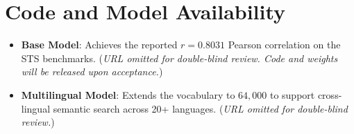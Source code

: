 \documentclass[11pt, conference, compsoc, twoside]{IEEEtran}
\begin{document}
\appendix
\section{Code and Model Availability}
\begin{itemize}
    \item \textbf{Base Model}: Achieves the reported $r = 0.8031$ Pearson correlation on the STS benchmarks. (\textit{URL omitted for double-blind review. Code and weights will be released upon acceptance.})
    \item \textbf{Multilingual Model}: Extends the vocabulary to $64{,}000$ to support cross-lingual semantic search across 20+ languages. (\textit{URL omitted for double-blind review.})
\end{itemize}


\balance
\end{document}
